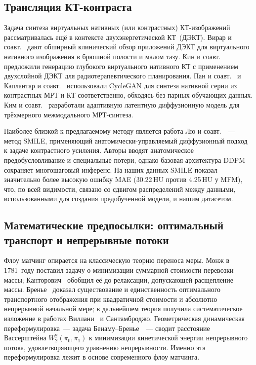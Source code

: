 \subsection{Трансляция КТ-контраста}

Задача синтеза виртуальных нативных (или контрастных) КТ-изображений рассматривалась ещё в контексте двухэнергетической КТ~(ДЭКТ). Вирар и соавт.~\cite{VIRARKAR2022293} дают обширный клинический обзор приложений ДЭКТ для виртуального нативного изображения в брюшной полости и малом тазу. Кин и соавт.~\cite{article_dual} предложили генерацию глубокого виртуального нативного КТ с применением двухслойной ДЭКТ для радиотерапевтического планирования. Пан и соавт.~\cite{pan2024synthetic} и Каплантар и соавт.~\cite{article_nature} использовали CycleGAN для синтеза нативной серии из контрастных МРТ и КТ соответственно, обходясь без парных обучающих данных. Ким и соавт.~\cite{kim2024adaptive} разработали адаптивную латентную диффузионную модель для трёхмерного межмодального МРТ-синтеза.

Наиболее близкой к предлагаемому методу является работа Лю и соавт.~\cite{liu2025see}~--- метод SMILE, применяющий анатомически-управляемый диффузионный подход к задаче контрастного усиления. Авторы вводят анатомическое предобусловливание и специальные потери, однако базовая архитектура DDPM сохраняет многошаговый инференс. На наших данных SMILE показал значительно более высокую ошибку MAE (30.22\,HU против 4.25\,HU у MFM), что, по всей видимости, связано со сдвигом распределений между данными, использованными для создания предобученной модели, и нашим датасетом.

\subsection{Математические предпосылки: оптимальный транспорт и непрерывные потоки}

Флоу матчинг опирается на классическую теорию переноса меры. Монж в 1781~году поставил задачу о минимизации суммарной стоимости перевозки массы; Канторович~\cite{kantorovich1942translocation} обобщил её до релаксации, допускающей расщепление массы. Бренье~\cite{brenier1991polar} доказал существование и единственность оптимального транспортного отображения при квадратичной стоимости и абсолютно непрерывной начальной мере; в дальнейшем теория получила систематическое изложение в работах Виллани~\cite{villani2008optimal} и Сантамброджо. Геометрическая динамическая переформулировка~--- задача Бенаму--Бренье~\cite{benamou2000computational}~--- сводит расстояние Вассерштейна $W_2^2(\pi_0,\pi_1)$ к минимизации кинетической энергии непрерывного потока, удовлетворяющего уравнению непрерывности. Именно эта переформулировка лежит в основе современного флоу матчинга.

